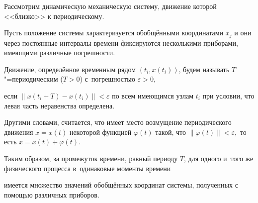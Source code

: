\small



Рассмотрим  динамическую механическую систему, движение которой <<близко>> к периодическому.

Пусть положение системы характеризуется обобщёнными координатами $x_j$  и они через постоянные интервалы времени фиксируются несколькими приборами, имеющими различные погрешности.



Движение, определённое временным рядом $(t_i, x(t_i))$, будем  называть $T$"=периодическим ($T>0$) с~погрешностью $\varepsilon>0$,

если $\|x(t_i+T) - x(t_i)\| < \varepsilon$ по всем имеющимся узлам $t_i$ при условии, что левая часть неравенства определена.





Другими словами, считается, что имеет место возмущение периодического движения $x = x(t)$ некоторой функцией $\varphi(t)$ такой, что $\|\varphi(t)\| < \varepsilon, $ то есть $ x = x(t) + \varphi(t).$

Таким образом, за промежуток времени, равный периоду $T$, для одного и~того же физического процесса в~одинаковые моменты времени

имеется множество значений обобщённых координат системы, полученных с помощью различных приборов.




